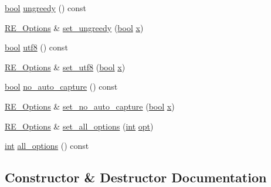 \begin{DoxyCompactItemize}
\item 
\hyperlink{aplibtool_8c_ad5c9d4ba3dc37783a528b0925dc981a0}{bool} \hyperlink{classpcrecpp_1_1RE__Options_a6f2f50ee9495c973590a6385937c0733}{ungreedy} () const 
\item 
\hyperlink{classpcrecpp_1_1RE__Options}{R\+E\+\_\+\+Options} \& \hyperlink{classpcrecpp_1_1RE__Options_a932963f06e0f26f2f482c6ff6ecbb3e0}{set\+\_\+ungreedy} (\hyperlink{aplibtool_8c_ad5c9d4ba3dc37783a528b0925dc981a0}{bool} \hyperlink{pcregrep_8txt_a4242e9148f20c002763bf4ba53b26ad6}{x})
\item 
\hyperlink{aplibtool_8c_ad5c9d4ba3dc37783a528b0925dc981a0}{bool} \hyperlink{classpcrecpp_1_1RE__Options_a5510afddee3c4e0ddc1d12dfdd210512}{utf8} () const 
\item 
\hyperlink{classpcrecpp_1_1RE__Options}{R\+E\+\_\+\+Options} \& \hyperlink{classpcrecpp_1_1RE__Options_a8ea3b31b5fb38ed17f92d0291ad06bbe}{set\+\_\+utf8} (\hyperlink{aplibtool_8c_ad5c9d4ba3dc37783a528b0925dc981a0}{bool} \hyperlink{pcregrep_8txt_a4242e9148f20c002763bf4ba53b26ad6}{x})
\item 
\hyperlink{aplibtool_8c_ad5c9d4ba3dc37783a528b0925dc981a0}{bool} \hyperlink{classpcrecpp_1_1RE__Options_aecefd1f9ae30ee92fdbe2934cc27dd47}{no\+\_\+auto\+\_\+capture} () const 
\item 
\hyperlink{classpcrecpp_1_1RE__Options}{R\+E\+\_\+\+Options} \& \hyperlink{classpcrecpp_1_1RE__Options_adfd706504f1259095b8861fd9a860429}{set\+\_\+no\+\_\+auto\+\_\+capture} (\hyperlink{aplibtool_8c_ad5c9d4ba3dc37783a528b0925dc981a0}{bool} \hyperlink{pcregrep_8txt_a4242e9148f20c002763bf4ba53b26ad6}{x})
\item 
\hyperlink{classpcrecpp_1_1RE__Options}{R\+E\+\_\+\+Options} \& \hyperlink{classpcrecpp_1_1RE__Options_abbf496e6bdfaba83e54174cadf383d87}{set\+\_\+all\+\_\+options} (\hyperlink{pcre_8txt_a42dfa4ff673c82d8efe7144098fbc198}{int} \hyperlink{group__APR__Util__DBM__SDBM_ga7dabf0be7fe6c0e41bab93d005632e83}{opt})
\item 
\hyperlink{pcre_8txt_a42dfa4ff673c82d8efe7144098fbc198}{int} \hyperlink{classpcrecpp_1_1RE__Options_ad0044e20b77cd735b6fb70b6dd8dc245}{all\+\_\+options} () const 
\end{DoxyCompactItemize}


\subsection{Constructor \& Destructor Documentation}
